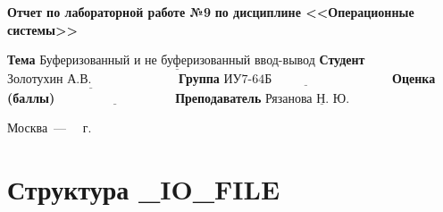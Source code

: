 \documentclass[12pt]{report}
\begin{document}
\begin{titlepage}
		\begin{center}
			\noindent\begin{minipage}{1.1\textwidth}\centering
				\Large\textbf{  Отчет по лабораторной работе №9}\newline
				\textbf{по дисциплине <<Операционные системы>>}\newline\newline
			\end{minipage}
		\end{center}
		
		\noindent\textbf{Тема} $\underline{\text{Буферизованный и не буферизованный ввод-вывод}}$\newline\newline
		\noindent\textbf{Студент} $\underline{\text{Золотухин А.В.~~~~~~~~~~~~~~~~~~~~}}$\newline\newline
		\noindent\textbf{Группа} $\underline{\text{ИУ7-64Б~~~~~~~~~~~~~~~~~~~~~~~~~~~~}}$\newline\newline
		\noindent\textbf{Оценка (баллы)} $\underline{\text{~~~~~~~~~~~~~~~~~~~~~~~~~~~}}$\newline\newline
		\noindent\textbf{Преподаватель} $\underline{\text{Рязанова Н. Ю.~~~~~~~}}$\newline
		
		\begin{center}
			\vfill
			Москва~---~\the\year
			~г.
		\end{center}
	\end{titlepage}


\chapter*{Структура \_IO\_FILE}
\end{document}
